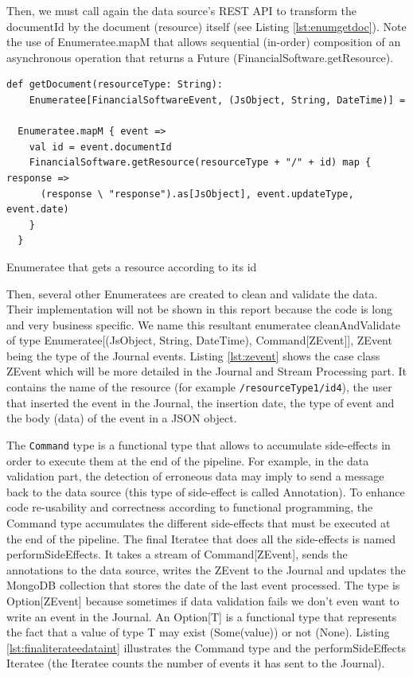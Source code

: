 Then, we must call again the data source's REST API to transform the documentId by the document (resource) itself (see Listing \ref{lst:enumgetdoc}).
Note the use of Enumeratee.mapM that allows sequential (in-order) composition of an asynchronous operation that returns a Future (FinancialSoftware.getResource).

\begin{listing}[h]
\begin{verbatim}
def getDocument(resourceType: String): 
    Enumeratee[FinancialSoftwareEvent, (JsObject, String, DateTime)] =

  Enumeratee.mapM { event =>
    val id = event.documentId
    FinancialSoftware.getResource(resourceType + "/" + id) map { response =>
      (response \ "response").as[JsObject], event.updateType, event.date)
    }
  }
\end{verbatim}
\caption{Enumeratee that gets a resource according to its id}
\label{lst:enumgetdoc}
\end{listing}

Then, several other Enumeratees are created to clean and validate the data. Their implementation will not be shown in this report because the code is long and very business specific.
We name this resultant enumeratee cleanAndValidate of type Enumeratee[(JsObject, String, DateTime), Command[ZEvent]], ZEvent being the type of the Journal events. 
Listing \ref{lst:zevent} shows the case class ZEvent which will be more detailed in the Journal and Stream Processing part. It contains the name of the resource (for example
\verb|/resourceType1/id4|), the user that inserted the event in the Journal, the insertion date, the type of event and the body (data) of the event in a JSON object.

The \verb|Command| type is a functional type that allows to accumulate side-effects in order to execute them at the end of the pipeline. For example, in the data validation part, the
detection of erroneous data may imply to send a message back to the data source (this type of side-effect is called Annotation). To enhance code re-usability and correctness according to functional programming, the Command type accumulates the different side-effects that must be executed at the end of the pipeline. The final Iteratee that does all the side-effects
is named performSideEffects. It takes a stream of Command[ZEvent], sends the annotations to the data source, writes the ZEvent to the Journal and updates
the MongoDB collection that stores the date of the last event processed. The type is
Option[ZEvent] because sometimes if data validation fails we don't even want to write an event in the Journal. An Option[T] is a functional type that represents the fact
that a value of type T may exist (Some(value)) or not (None).
Listing \ref{lst:finaliterateedataint} illustrates the Command type and the performSideEffects Iteratee (the Iteratee counts the number of events it has sent to the Journal).

